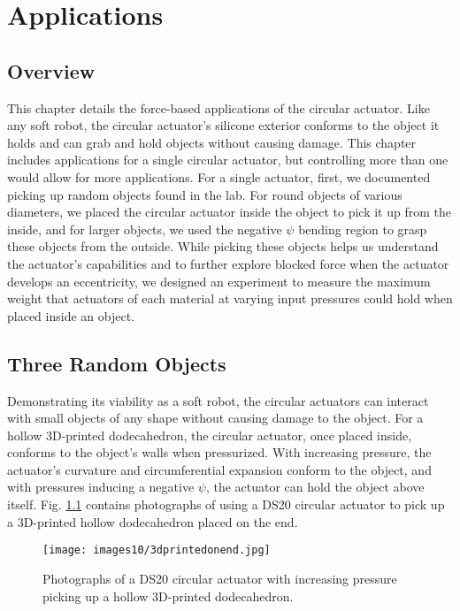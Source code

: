 \chapter{Applications}

\section*{Overview}
This chapter details the force-based applications of the circular actuator. Like any soft robot, the circular actuator's silicone exterior conforms to the object it holds and can grab and hold objects without causing damage. This chapter includes applications for a single circular actuator, but controlling more than one would allow for more applications. For a single actuator, first, we documented picking up random objects found in the lab. For round objects of various diameters, we placed the circular actuator inside the object to pick it up from the inside, and for larger objects, we used the negative $\psi$ bending region to grasp these objects from the outside. While picking these objects helps us understand the actuator's capabilities and to further explore blocked force when the actuator develops an eccentricity, we designed an experiment to measure the maximum weight that actuators of each material at varying input pressures could hold when placed inside an object.

\section{Three Random Objects}
Demonstrating its viability as a soft robot, the circular actuators can interact with small objects of any shape without causing damage to the object. For a hollow 3D-printed dodecahedron, the circular actuator, once placed inside, conforms to the object's walls when pressurized. With increasing pressure, the actuator's curvature and circumferential expansion conform to the object, and with pressures inducing a negative $\psi$, the actuator can hold the object above itself. Fig. \ref{fig:3dprintedonend} contains photographs of using a DS20 circular actuator to pick up a 3D-printed hollow dodecahedron placed on the end. 

\begin{figure}[!ht]
    \centering
    \texttt{[image: images10/3dprintedonend.jpg]}
    \caption{Photographs of a DS20 circular actuator with increasing pressure picking up a hollow 3D-printed dodecahedron.}
    \label{fig:3dprintedonend}
\end{figure}

